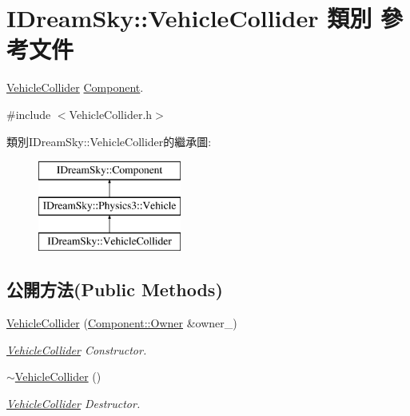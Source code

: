 \hypertarget{class_i_dream_sky_1_1_vehicle_collider}{}\section{I\+Dream\+Sky\+:\+:Vehicle\+Collider 類別 參考文件}
\label{class_i_dream_sky_1_1_vehicle_collider}


\hyperlink{class_i_dream_sky_1_1_vehicle_collider}{Vehicle\+Collider} \hyperlink{class_i_dream_sky_1_1_component}{Component}.  




{\ttfamily \#include $<$Vehicle\+Collider.\+h$>$}

類別\+I\+Dream\+Sky\+:\+:Vehicle\+Collider的繼承圖\+:\begin{figure}[H]
\begin{center}
\leavevmode
\includegraphics[height=3.000000cm]{class_i_dream_sky_1_1_vehicle_collider}
\end{center}
\end{figure}
\subsection*{公開方法(Public Methods)}
\begin{DoxyCompactItemize}
\item 
\hyperlink{class_i_dream_sky_1_1_vehicle_collider_a8d7f5cedccf818b6b2930daf62e77a9a}{Vehicle\+Collider} (\hyperlink{class_i_dream_sky_1_1_component_1_1_owner}{Component\+::\+Owner} \&owner\+\_\+)
\begin{DoxyCompactList}\small\item\em \hyperlink{class_i_dream_sky_1_1_vehicle_collider}{Vehicle\+Collider} Constructor. \end{DoxyCompactList}\item 
\hyperlink{class_i_dream_sky_1_1_vehicle_collider_a77ca7dc0653dd6bb43d91ad01ce6b8ea}{$\sim$\+Vehicle\+Collider} ()
\begin{DoxyCompactList}\small\item\em \hyperlink{class_i_dream_sky_1_1_vehicle_collider}{Vehicle\+Collider} Destructor. \end{DoxyCompactList}\end{DoxyCompactItemize}
